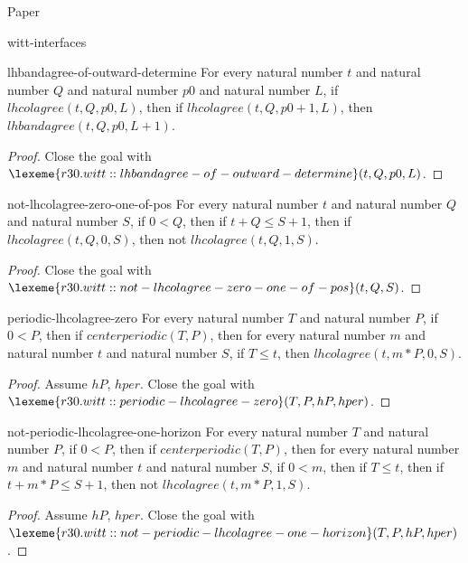 \begin{lexlean}{Paper}
\begin{section}{witt-interfaces}
  \begin{theorem}{lhbandagree-of-outward-determine}
  For every natural number \(t\) and natural number \(Q\) and natural number \(p0\) and natural number \(L\), if \(lhcolagree(t, Q, p0, L)\), then if \(lhcolagree(t, Q, p0 + 1, L)\), then \(lhbandagree(t, Q, p0, L + 1)\).
  \begin{proof}
  Close the goal with \(\lexeme{r30.witt::lhbandagree-of-outward-determine}(t, Q, p0, L)\).
  \end{proof}
  \end{theorem}

  \begin{theorem}{not-lhcolagree-zero-one-of-pos}
  For every natural number \(t\) and natural number \(Q\) and natural number \(S\), if \(0 < Q\), then if \(t + Q ≤ S + 1\), then if \(lhcolagree(t, Q, 0, S)\), then not \(lhcolagree(t, Q, 1, S)\).
  \begin{proof}
  Close the goal with \(\lexeme{r30.witt::not-lhcolagree-zero-one-of-pos}(t, Q, S)\).
  \end{proof}
  \end{theorem}

  \begin{theorem}{periodic-lhcolagree-zero}
  For every natural number \(T\) and natural number \(P\), if \(0 < P\), then if \(centerperiodic(T, P)\), then for every natural number \(m\) and natural number \(t\) and natural number \(S\), if \(T ≤ t\), then \(lhcolagree(t, m * P, 0, S)\).
  \begin{proof}
  Assume \(hP\), \(hper\).
  Close the goal with \(\lexeme{r30.witt::periodic-lhcolagree-zero}(T, P, hP, hper)\).
  \end{proof}
  \end{theorem}

  \begin{theorem}{not-periodic-lhcolagree-one-horizon}
  For every natural number \(T\) and natural number \(P\), if \(0 < P\), then if \(centerperiodic(T, P)\), then for every natural number \(m\) and natural number \(t\) and natural number \(S\), if \(0 < m\), then if \(T ≤ t\), then if \(t + m * P ≤ S + 1\), then not \(lhcolagree(t, m * P, 1, S)\).
  \begin{proof}
  Assume \(hP\), \(hper\).
  Close the goal with \(\lexeme{r30.witt::not-periodic-lhcolagree-one-horizon}(T, P, hP, hper)\).
  \end{proof}
  \end{theorem}


\end{section}
\end{lexlean}
